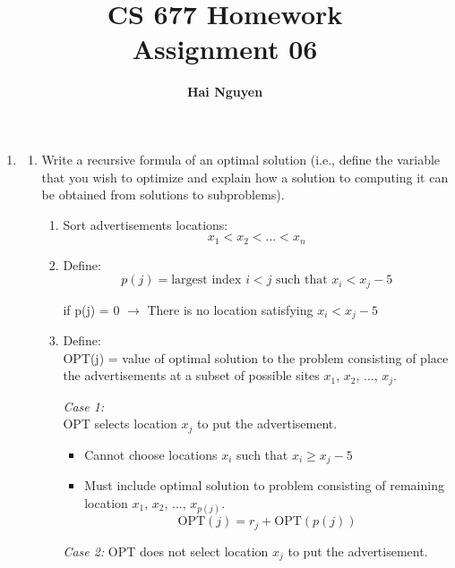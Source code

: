 \documentclass[11pts]{report}
\title{CS 677 Homework \\ Assignment 06}
\author{\textbf{Hai Nguyen}}
\begin{document}
\maketitle

\begin{enumerate}

\item 
\begin{enumerate}
\item Write a recursive formula of an optimal solution (i.e., define the variable that you wish to optimize and explain how a solution to computing it can be obtained from solutions to subproblems).

\begin{enumerate}

\item Sort advertisements locations: 
\begin{equation*}
    x_1 < x_2 < ... < x_n
\end{equation*}

\item Define: 
\begin{equation*}
p(j) = \text{largest index } i < j \text{ such that }x_i < x_j - 
5
\end{equation*}
\begin{center}
if p(j) = 0 $\to$ There is no location satisfying $x_i < x_j - 
5$
\end{center}

\item Define:
\\ OPT(j) = value of optimal solution to the problem consisting of place the advertisements at a subset of possible sites $x_1$, $x_2$, ..., $x_j$.

\textit{Case 1:}
\\ OPT selects location $x_j$ to put the advertisement.
\begin{itemize}

	\item Cannot choose locations $x_i$ such that $x_i \geq x_j - 5$
	\item Must include optimal solution to problem consisting of remaining location $x_1$, $x_2$, ..., $x_{p(j)}$.
	\begin{equation*}
	\text{OPT}(j) = r_j + \text{OPT}(p(j))
	\end{equation*}	 
\end{itemize}
\textit{Case 2:}
OPT does not select location $x_j$ to put the advertisement.
\begin{itemize}


\end{itemize}
\end{enumerate}
\end{enumerate}
\end{enumerate}
\end{document}
